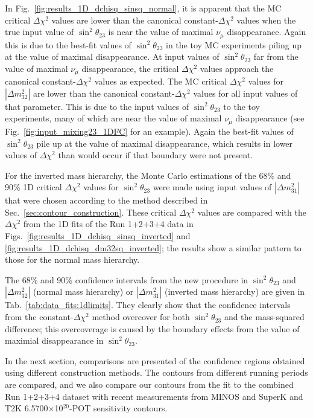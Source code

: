 In Fig.\ \ref{fig:results_1D_dchisq_sinsq_normal}, it is apparent that the MC critical $\Delta\chi^{2}$ values are lower than the canonical 
constant-$\Delta\chi^{2}$ values when the true input value of $\sin^2 \theta_{23}$ is near the value of maximal $\nu_{\mu}$ disappearance. 
Again this is due to the best-fit values of $\sin^2 \theta_{23}$ in the toy MC experiments piling up at the value of maximal disappearance.
At input values of $\sin^2 \theta_{23}$ far from the value of maximal 
$\nu_{\mu}$ disappearance, the critical $\Delta\chi^{2}$ values approach the canonical constant-$\Delta\chi^{2}$ values as expected. The MC 
critical $\Delta\chi^{2}$ values for $|\Delta m_{32}^{2}|$ are lower than the canonical constant-$\Delta\chi^{2}$ values for all input values 
of that parameter. This is due to the input values of $\sin^2 \theta_{23}$ to the toy experiments, many of which are near the value of maximal 
$\nu_{\mu}$ disappearance (see Fig.\ \ref{fig:input_mixing23_1DFC} for an example). Again the best-fit values of $\sin^2 \theta_{23}$ pile up 
at the value of maximal disappearance, which results in lower values of $\Delta\chi^{2}$ than would occur if that boundary were not present. 

For the inverted mass hierarchy, the Monte Carlo estimations of the 68\% and 90\% 1D critical $\Delta\chi^{2}$ values for $\sin^2 \theta_{23}$ 
were made using input values of $|\Delta m_{31}^{2}|$ that were chosen according to the method described in Sec.\ \ref{sec:contour_construction}. 
These critical $\Delta\chi^{2}$ values are compared with the $\Delta\chi^{2}$ from the 1D fits of the Run 1+2+3+4 data in Figs.\ 
\ref{fig:results_1D_dchisq_sinsq_inverted} and \ref{fig:results_1D_dchisq_dm32sq_inverted}; the results show a similar pattern to those for 
the normal mass hierarchy.

The 68\% and 90\% confidence intervals from the new procedure in $\sin^2 \theta_{23}$ and $|\Delta m_{32}^{2}|$ (normal mass hierarchy) or 
$|\Delta m_{31}^{2}|$ (inverted mass hierarchy) are given in Tab.\ \ref{tab:data_fits:1dlimits}. They clearly show that the confidence 
intervals from the constant-$\Delta\chi^{2}$ method overcover for both $\sin^2 \theta_{23}$ and the mass-squared difference; this overcoverage 
is caused by the boundary effects from the value of maximial disappearance  in $\sin^2 \theta_{23}$.

In the next section, comparisons are presented of the confidence regions obtained 
using different construction methods.
The contours from different running periods are compared, and we also compare our contours
from the fit to the combined Run 1+2+3+4 dataset with recent measurements from MINOS and 
SuperK and T2K 6.5700$\times$10$^{20}$-POT sensitivity contours. 


